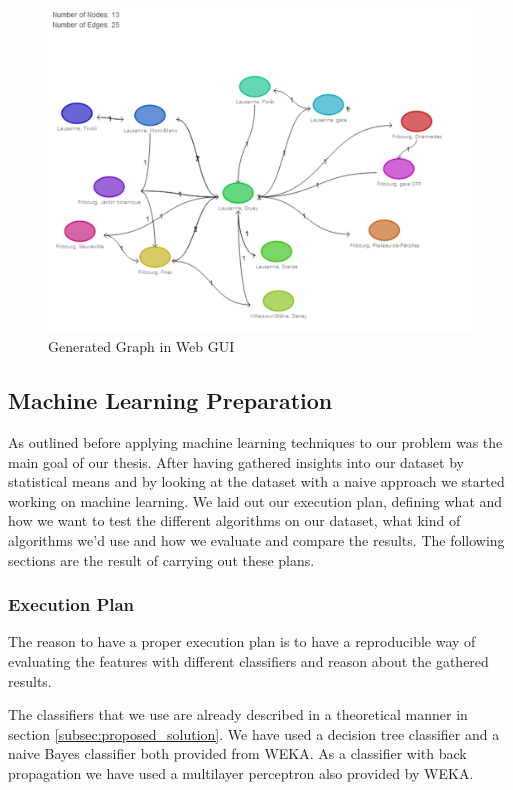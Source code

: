 \begin{figure}[!ht]
	\centering
	\includegraphics[width=1.0\textwidth]{images/web-gui}
	\caption{Generated Graph in Web GUI}
	\label{figure:web_gui_graph}
\end{figure}

\subsection{Machine Learning Preparation}
\label{subsec:machine_learning_results}
As outlined before applying machine learning techniques to our problem was the main goal of our thesis. After having gathered insights into our dataset by statistical means and by looking at the dataset with a naive approach we started working on machine learning. We laid out our execution plan, defining what and how we want to test the different algorithms on our dataset, what kind of algorithms we'd use and how we evaluate and compare the results. The following sections are the result of carrying out these plans.

\subsubsection{Execution Plan}
The reason to have a proper execution plan is to have a reproducible way of evaluating the features with different classifiers and reason about the gathered results. 

The classifiers that we use are already described in a theoretical manner in section \ref{subsec:proposed_solution}. We have used a decision tree classifier and a naive Bayes classifier both provided from WEKA. As a classifier with back propagation we have used a multilayer perceptron also provided by WEKA.

